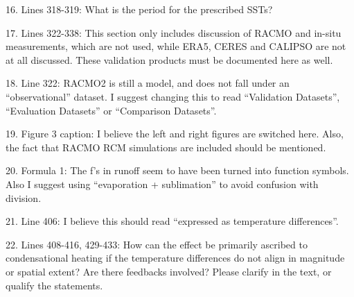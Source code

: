 \documentclass[12pt,oneside,a4paper]{article}%
\begin{document}
16. Lines 318-319: What is the period for the prescribed SSTs? \newline

{\color{blue}{Perpetual 1979. Added this in parantheses.}} \newline

17. Lines 322-338: This section only includes discussion of RACMO and in-situ measurements, which are not used, while ERA5, CERES and CALIPSO are not at all discussed. These validation products must be documented here as well. \newline

{\color{blue}{Fixed.}} \newline

18. Line 322: RACMO2 is still a model, and does not fall under an “observational” dataset. I suggest changing this to read “Validation Datasets”, “Evaluation Datasets” or “Comparison Datasets”. \newline

{\color{blue}{Changed to validation dataset throughout the manuscript.}} \newline

19. Figure 3 caption: I believe the left and right figures are switched here. Also, the fact that RACMO RCM simulations are included should be mentioned. \newline

{\color{blue}{Fixed, and included references to the RACMO grids in the text and figure caption.}} \newline

20. Formula 1: The f’s in runoff seem to have been turned into function symbols. Also I suggest using “evaporation + sublimation” to avoid confusion with division. \newline

{\color{blue}{Switched to type writer font. Used reviewers suggestion to replace slash with a plus sign.}} \newline

21. Line 406: I believe this should read “expressed as temperature differences”. 

{\color{blue}{Did something similar, as temperature was missing from the sentence.}} \newline

22. Lines 408-416, 429-433: How can the effect be primarily ascribed to condensational heating if the temperature differences do not align in magnitude or spatial extent? Are there feedbacks involved? Please clarify in the text, or qualify the statements. \newline
\end{document}
